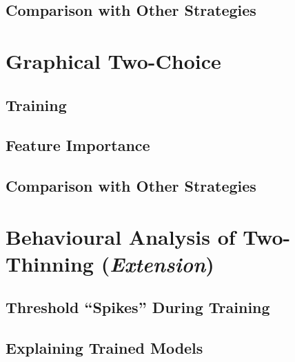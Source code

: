 \subsection{Comparison with Other Strategies}


\section{Graphical Two-Choice}


\subsection{Training}


\subsection{Feature Importance}


\subsection{Comparison with Other Strategies}


\section{Behavioural Analysis of Two-Thinning (\textit{Extension})}


\subsection{Threshold ``Spikes'' During Training}


\subsection{Explaining Trained Models}